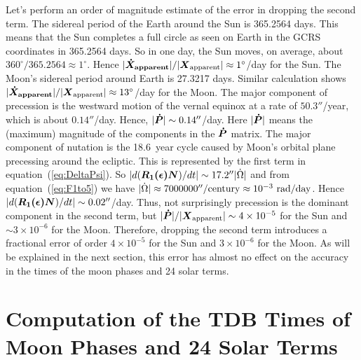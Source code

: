 \documentclass[12pt]{article}
\newcommand{\ve}[1]{\mbox{\boldmath $#1$}}
\begin{document}
\begin{CJK}{UTF8}{bkai}
Let's perform an order of magnitude estimate of the error in dropping the second term. 
The sidereal period of 
the Earth around the Sun is 365.2564 days. This means that the Sun completes a 
full circle as seen on Earth in the GCRS coordinates in 365.2564 days. So 
in one day, the Sun moves, on average, about $360^\circ/365.2564 \approx 1^\circ$. 
Hence $|\ve{\dot{X}_{\rm apparent}}|/|\ve{X}_{\rm apparent}| \approx 1^\circ$/day 
for the Sun. The Moon's sidereal period around Earth is 27.3217 days. Similar 
calculation shows 
$|\ve{\dot{X}_{\rm apparent}}|/|\ve{X}_{\rm apparent}| \approx 13^\circ$/day 
for the Moon. The major component of precession is the westward motion 
of the vernal equinox at a rate of $50.3''$/year, which is about $0.14''$/day. 
Hence, $|\ve{\dot{P}}|\sim 0.14''$/day. Here $|\ve{\dot{P}}|$ means 
the (maximum) magnitude of the components in the $\ve{\dot{P}}$ matrix. 
The major component of nutation is 
the 18.6~year cycle caused by Moon's orbital plane precessing around the ecliptic. 
This is represented by the first term in equation~(\ref{eq:DeltaPsi}). So 
$|d(\ve{R_1(\epsilon)N})/dt|\sim 17.2'' |\dot{\Omega}|$ and from equation~(\ref{eq:F1to5}) 
we have $|\dot{\Omega}| \approx 7000000''/{\rm century} \approx 10^{-3}~{\rm rad/day}$. 
Hence $|d(\ve{R_1(\epsilon)N})/dt|\sim 0.02''$/day. Thus, not surprisingly precession is 
the dominant component in the second term, but $|\ve{\dot{P}}|/|\ve{X}_{\rm apparent}| 
\sim 4\times 10^{-5}$ for the Sun and $\sim 3\times 10^{-6}$ for the Moon. 
Therefore, dropping the second term introduces a fractional error of order 
$4\times 10^{-5}$ for the Sun and $3\times 10^{-6}$ for the Moon. As will be 
explained in the next section, this error has almost no effect on the accuracy 
in the times of the moon phases and 24 solar terms.

\section{Computation of the TDB Times of Moon Phases and 24 Solar Terms} 
\label{sec:TDBtimes}


\end{CJK}
\end{document}
